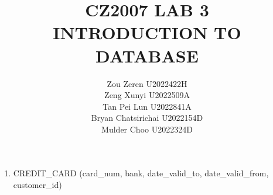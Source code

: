 \documentclass[hidelinks,12pt]{article}
\begin{document}
\title{CZ2007 LAB 3\\
\large INTRODUCTION TO DATABASE}
\date{}
\author{
    Zou Zeren U2022422H\\
    Zeng Xunyi U2022509A\\
    Tan Pei Lun U2022841A\\
    Bryan Chatsirichai U2022154D\\
    Mulder Choo U2022324D
}
\maketitle\thispagestyle{fancy}
\newpage

\tableofcontents
\newpage
\begin{enumerate}
    \section{CREDIT\_CARD}
    \item[] CREDIT\_CARD (card\_num, bank, date\_valid\_to, date\_valid\_from, customer\_id) 




\end{enumerate}
\end{document}
